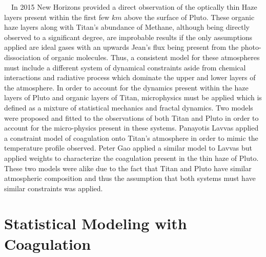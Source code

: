 \documentclass[useAMS,natbib]{mn2e}
\begin{document}
\indent~~In 2015 New Horizons provided a direct observation of the optically thin Haze layers present within the first few $km$ above the surface of Pluto. These organic haze layers along with Titan's abundance of Methane, although being directly observed to a significant degree, are improbable results if the only assumptions applied are ideal gases with an upwards Jean's flux being present from the photo-dissociation of organic molecules. Thus, a consistent model for these atmospheres must include a different system of dynamical constraints aside from chemical interactions and radiative process which dominate the upper and lower layers of the atmosphere. In order to account for the dynamics present within the haze layers of Pluto and organic layers of Titan, microphysics must be applied which is defined as a mixture of statistical mechanics and fractal dynamics. Two models were proposed and fitted to the observations of both Titan and Pluto in order to account for the micro-physics present in these systems. Panayotis Lavvas applied a constraint model of coagulation onto Titan's atmosphere in order to mimic the temperature profile observed. Peter Gao applied a similar model to Lavvas but applied weights to characterize the coagulation present in the thin haze of Pluto. These two models were alike due to the fact that Titan and Pluto have similar atmospheric composition and thus the assumption that both systems must have similar constraints was applied.\\
\section{Statistical Modeling with Coagulation}
\end{document}
